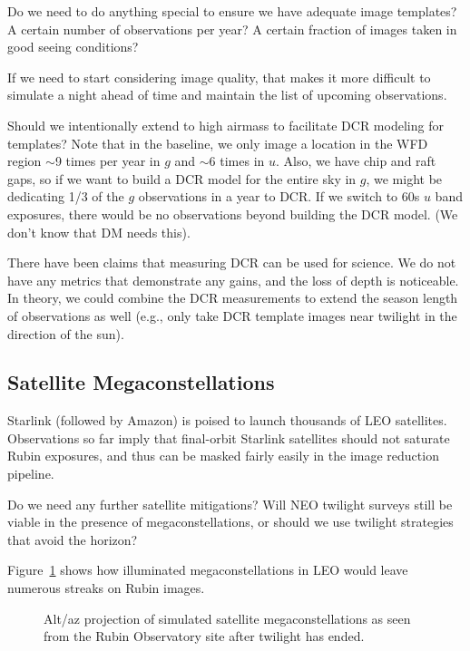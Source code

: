 Do we need to do anything special to ensure we have adequate image templates? A certain number of observations per year? A certain fraction of images taken in good seeing conditions? 

If we need to start considering image quality, that makes it more difficult to simulate a night ahead of time and maintain the list of upcoming observations.

Should we intentionally extend to high airmass to facilitate DCR modeling for templates? Note that in the baseline, we only image a location in the WFD region $\sim$9 times per year in $g$ and $\sim$6 times in $u$. Also, we have chip and raft gaps, so if we want to build a DCR model for the entire sky in $g$, we might be dedicating 1/3 of the $g$ observations in a year to DCR. If we switch to 60s $u$ band exposures, there would be no observations beyond building the DCR model. (We don't know that DM needs this).

There have been claims that measuring DCR can be used for science.  We do not have any metrics that demonstrate any gains, and the loss of depth is noticeable. In theory, we could combine the DCR measurements to extend the season length of observations as well (e.g., only take DCR template images near twilight in the direction of the sun).


\subsection{Satellite Megaconstellations}

Starlink (followed by Amazon) is poised to launch thousands of LEO satellites. Observations so far imply that final-orbit Starlink satellites should not saturate Rubin exposures, and thus can be masked fairly easily in the image reduction pipeline. 

Do we need any further satellite mitigations? Will NEO twilight surveys still be viable in the presence of megaconstellations, or should we use twilight strategies that avoid the horizon?

Figure~\ref{fig:megasat} shows how illuminated megaconstellations in LEO would leave numerous streaks on Rubin images.

\begin{figure}
\label{fig:megasat}
\caption{Alt/az projection of simulated satellite megaconstellations as seen from the Rubin Observatory site after twilight has ended. } 
\end{figure}



